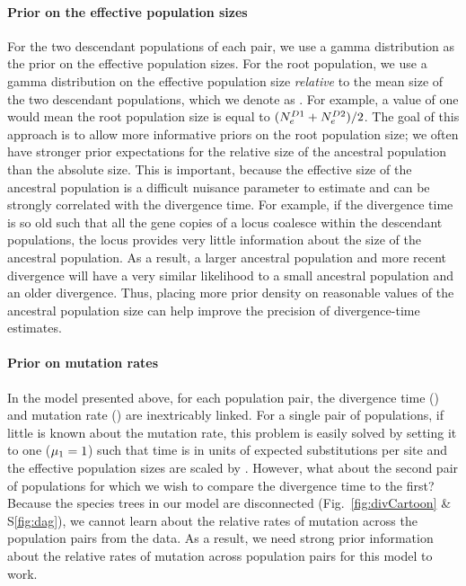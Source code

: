 \paragraph{Prior on the effective population sizes}
For the two descendant populations of each pair, we use a gamma distribution as
the prior on the effective population sizes.
For the root population, we use a gamma distribution on the effective
population size \emph{relative} to the mean size of the two descendant
populations, which we denote as \rootrelativepopsize.
For example, a value of one would mean the root population size is equal to 
$(\epopsize[\descendantpopindex{1}] + \epopsize[\descendantpopindex{2}]) / 2$.
The goal of this approach is to allow more informative priors on the root
population size; we often have stronger prior expectations for the relative
size of the ancestral population than the absolute size.
This is important, because the effective size of the ancestral population is a
difficult nuisance parameter to estimate and can be strongly correlated with
the divergence time.
For example, if the divergence time is so old such that all the gene copies
of a locus coalesce within the descendant populations, the locus
provides very little information about the size of the ancestral
population.
As a result, a larger ancestral population and more recent divergence will have
a very similar likelihood to a small ancestral population and an older
divergence.
Thus, placing more prior density on reasonable values of the ancestral
population size can help improve the precision of divergence-time estimates.

\paragraph{Prior on mutation rates}
In the model presented above, for each population pair, the divergence time
(\divtime) and mutation rate (\murate) are inextricably linked.
For a single pair of populations, if little is known about the mutation rate,
this problem is easily solved by setting it to one ($\murate[1] = 1$) such
that time is in units of expected substitutions per site and the effective
population sizes are scaled by \murate.
However, what about the second pair of populations for which we wish to compare
the divergence time to the first?
Because the species trees in our model are disconnected
(Fig.~\ref{fig:divCartoon} \& S\ref{fig:dag}),
we cannot learn about
the relative rates of mutation across the population pairs from the data.
As a result, we need strong prior information about the relative rates of
mutation across population pairs for this model to work.

